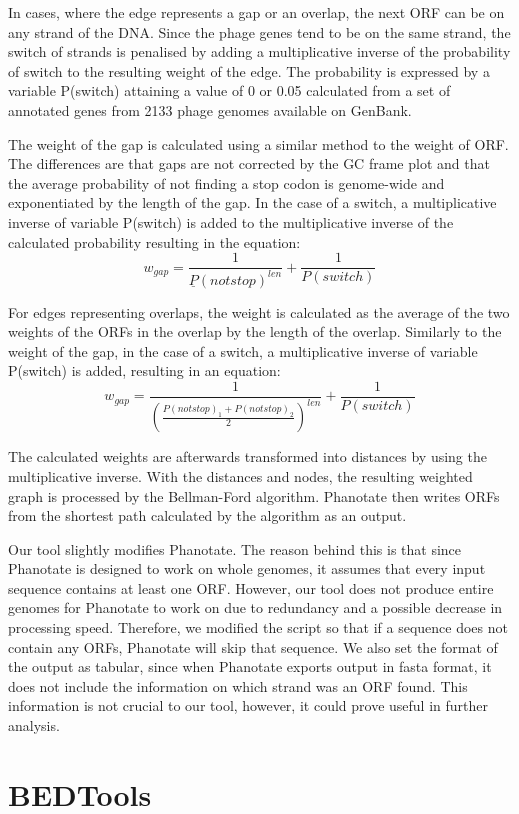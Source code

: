 In cases, where the edge represents a gap or an overlap, the next ORF can be on any strand of the DNA. Since the phage genes tend to be on the same strand, the switch of strands is penalised by adding a multiplicative inverse of the probability of switch to the resulting weight of the edge. The probability is expressed by a variable P(switch) attaining a value of 0 or 0.05 calculated from a set of annotated genes from 2133 phage genomes available on GenBank.

The weight of the gap is calculated using a similar method to the weight of ORF. The differences are that gaps are not corrected by the GC frame plot and that the average probability of not finding a stop codon is genome-wide and exponentiated by the length of the gap. In the case of a switch, a multiplicative inverse of variable P(switch) is added to the multiplicative inverse of the calculated probability resulting in the equation:
\[w_{gap} = \frac{1}{\underline{P}(not stop)^{len}} + \frac{1}{P(switch)}\]

For edges representing overlaps, the weight is calculated as the average of the two weights of the ORFs in the overlap by the length of the overlap. Similarly to the weight of the gap, in the case of a switch, a multiplicative inverse of variable P(switch) is added, resulting in an equation:
\[w_{gap} = \frac{1}{(\frac{P(not stop)_{1} + P(not stop)_{2}}{2})^{len}} + \frac{1}{P(switch)}\]

The calculated weights are afterwards transformed into distances by using the multiplicative inverse. With the distances and nodes, the resulting weighted graph is processed by the Bellman-Ford algorithm. Phanotate then writes ORFs from the shortest path calculated by the algorithm as an output.

Our tool slightly modifies Phanotate. The reason behind this is that since Phanotate is designed to work on whole genomes, it assumes that every input sequence contains at least one ORF. However, our tool does not produce entire genomes for Phanotate to work on due to redundancy and a possible decrease in processing speed. Therefore, we modified the script so that if a sequence does not contain any ORFs, Phanotate will skip that sequence. We also set the format of the output as tabular, since when Phanotate exports output in fasta format, it does not include the information on which strand was an ORF found. This information is not crucial to our tool, however, it could prove useful in further analysis.

\section{BEDTools}
